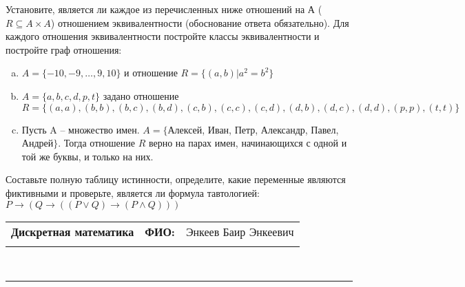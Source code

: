 \documentclass[10pt]{exam}
\newcommand{\class}{Дискретная математика}
\newcommand{\examdate}{}
\begin{document}
\begin{questions}
\question
Установите, является ли каждое из перечисленных ниже отношений на А ($R \subseteq A \times A$) отношением эквивалентности (обоснование ответа обязательно). Для каждого отношения эквивалентности постройте классы 
эквивалентности и постройте граф отношения:
\begin{enumerate} [a)]\setcounter{enumi}{0}
\item $A = \{-10, -9, … , 9, 10\}$ и отношение $R = \{(a,b)|a^{2} = b^{2}\}$
\item $A = \{a, b, c, d, p, t\}$ задано отношение $R = \{(a, a), (b, b), (b, c), (b, d), (c, b), (c, c), (c, d), (d, b), (d, c), (d, d), (p,p), (t,t)\}$
\item Пусть A – множество имен. $A = \{ $Алексей, Иван, Петр, Александр, Павел, Андрей$ \}$. Тогда отношение $R$ верно на парах имен, начинающихся с одной и той же буквы, и только на них.
\end{enumerate}\question Составьте полную таблицу истинности, определите, какие переменные являются фиктивными и проверьте, является ли формула тавтологией:
$ P \rightarrow (Q \rightarrow ((P \lor Q) \rightarrow (P \land Q)))$

\end{questions}
\newpage
\begin{flushright}
\begin{tabular}{p{2.8in} r l}
\textbf{\class} & \textbf{ФИО:} &Энкеев Баир Энкеевич
\\

\textbf{\examdate} &&\\
\end{tabular}\\
\end{flushright}
\rule[1ex]{\textwidth}{.1pt}
\end{document}
